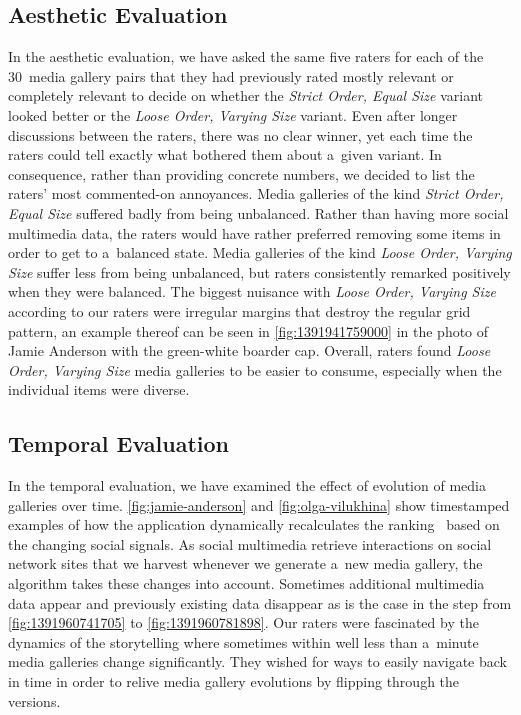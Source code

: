 \documentclass{sig-alternate-somus}
\begin{document}
\subsection{Aesthetic Evaluation}

In the aesthetic evaluation, we have asked the same five raters
for each of the 30~media gallery pairs
that they had previously rated mostly relevant or completely relevant
to decide on whether the \emph{Strict Order, Equal Size}
variant looked better or the \emph{Loose Order, Varying Size} variant.
Even after longer discussions between the raters,
there was no clear winner, yet each time the raters could tell exactly
what bothered them about a~given variant.
In consequence, rather than providing concrete numbers,
we decided to list the raters' most commented-on annoyances.
Media galleries of the kind \emph{Strict Order, Equal Size}
suffered badly from being unbalanced.
Rather than having more social multimedia data,
the raters would have rather preferred removing some items
in order to get to a~balanced state.
Media galleries of the kind \emph{Loose Order, Varying Size}
suffer less from being unbalanced,
but raters consistently remarked positively when they were balanced.
The biggest nuisance with \emph{Loose Order, Varying Size}
according to our raters were irregular margins
that destroy the regular grid pattern,
an example thereof can be seen in \autoref{fig:1391941759000}
in the photo of Jamie Anderson with the green-white boarder cap.
Overall, raters found \emph{Loose Order, Varying Size} media galleries
to be easier to consume, especially when the individual items were diverse.

\subsection{Temporal Evaluation}

In the temporal evaluation, we have examined the effect of 
evolution of media galleries over time.
\autoref{fig:jamie-anderson} and \autoref{fig:olga-vilukhina}
show timestamped examples of how the application
dynamically recalculates the ranking~\cite{steiner2013meteoroid}
based on the changing social signals.
As social multimedia retrieve interactions on social network sites
that we harvest whenever we generate a~new media gallery,
the algorithm takes these changes into account.
Sometimes additional multimedia data appear and
previously existing data disappear
as is the case in the step from \autoref{fig:1391960741705}
to \autoref{fig:1391960781898}.
Our raters were fascinated by the dynamics of the storytelling
where sometimes within well less than a~minute
media galleries change significantly.
They wished for ways to easily navigate back in time
in order to relive media gallery evolutions
by flipping through the versions.
\end{document}
